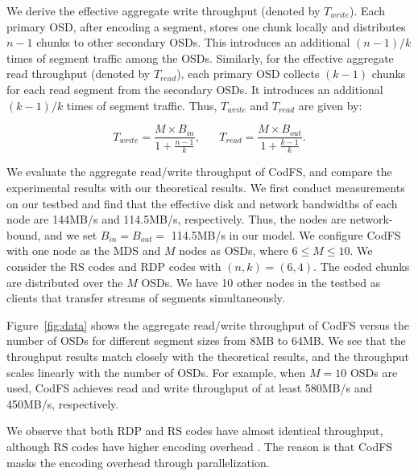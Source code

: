 We derive the effective aggregate write throughput (denoted by
$T_{write}$).  Each primary OSD, after encoding a segment, stores one chunk
locally and distributes $n-1$ chunks to other secondary OSDs.  This introduces
an additional $(n-1)/k$ times of segment traffic among the OSDs.
Similarly, for the effective aggregate read throughput (denoted by
$T_{read}$), each primary OSD collects $(k-1)$ chunks for each read segment
from the secondary OSDs. It introduces an additional $(k-1)/k$ times of segment
traffic.  Thus, $T_{write}$ and $T_{read}$ are given by: 

\begin{equation*}
    T_{write} = \frac{M\times B_{in}}{1+\frac{n-1}{k}} , \hspace{20pt}
    T_{read} = \frac {M\times B_{out}}{1+\frac{k-1}{k}}.
\end{equation*}


We evaluate the aggregate read/write throughput of CodFS, and compare the
experimental results with our theoretical results.  We first conduct
measurements on our testbed and find that the effective disk and network
bandwidths of each node are 144MB/s and 114.5MB/s, respectively.  Thus,
the nodes are network-bound, and we set $B_{in}\!=\!B_{out}\!=$ 114.5MB/s in
our model.  We configure CodFS with one node as the MDS and $M$ nodes as OSDs,
where $6\!\le\!M\!\le\!10$.  We consider the RS codes and RDP
codes with $(n,k) = (6,4)$.  The coded chunks are distributed
over the $M$ OSDs.  We
have 10 other nodes in the testbed as clients that transfer streams of
segments simultaneously. 

Figure~\ref{fig:data} shows the aggregate read/write throughput of CodFS
versus the number of OSDs for different segment sizes from 8MB to 64MB. We see
that the throughput results match closely with the theoretical results, and the
throughput scales linearly with the number of OSDs.  For example, when $M=10$
OSDs are used, CodFS achieves read and write throughput of at least 580MB/s
and 450MB/s, respectively.  

We observe that both RDP and RS codes have almost identical throughput, although
RS codes have higher encoding overhead \cite{plank09}.  The reason is that CodFS
masks the encoding overhead through parallelization. 

